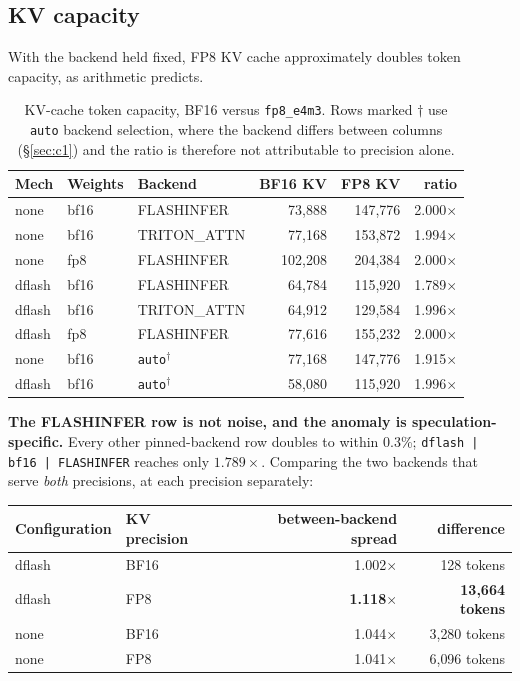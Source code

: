 \documentclass[11pt]{article}
\newcommand{\tw}[1]{\texttt{\small #1}}
\begin{document}
\subsection{KV capacity}

With the backend held fixed, FP8 KV cache approximately doubles token
capacity, as arithmetic predicts.

\begin{table}[h]\centering\small
\caption{KV-cache token capacity, BF16 versus \tw{fp8\_e4m3}. Rows marked
$\dagger$ use \tw{auto} backend selection, where the backend differs between
columns (\S\ref{sec:c1}) and the ratio is therefore not attributable to
precision alone.}
\begin{tabular}{lllrrr}
\toprule
Mech & Weights & Backend & BF16 KV & FP8 KV & ratio\\
\midrule
none & bf16 & FLASHINFER & 73{,}888 & 147{,}776 & 2.000$\times$\\
none & bf16 & TRITON\_ATTN & 77{,}168 & 153{,}872 & 1.994$\times$\\
none & fp8 & FLASHINFER & 102{,}208 & 204{,}384 & 2.000$\times$\\
dflash & bf16 & FLASHINFER & 64{,}784 & 115{,}920 & 1.789$\times$\\
dflash & bf16 & TRITON\_ATTN & 64{,}912 & 129{,}584 & 1.996$\times$\\
dflash & fp8 & FLASHINFER & 77{,}616 & 155{,}232 & 2.000$\times$\\
\midrule
none & bf16 & \tw{auto}$^\dagger$ & 77{,}168 & 147{,}776 & 1.915$\times$\\
dflash & bf16 & \tw{auto}$^\dagger$ & 58{,}080 & 115{,}920 & 1.996$\times$\\
\bottomrule
\end{tabular}
\end{table}

\noindent
\textbf{The FLASHINFER row is not noise, and the anomaly is
speculation-specific.} Every other pinned-backend row doubles to within
0.3\%; \tw{dflash\,|\,bf16\,|\,FLASHINFER} reaches only $1.789\times$.
Comparing the two backends that serve \emph{both} precisions, at each
precision separately:

\begin{table}[h]\centering\small
\begin{tabular}{llrr}
\toprule
Configuration & KV precision & between-backend spread & difference\\
\midrule
dflash & BF16 & 1.002$\times$ & 128 tokens\\
dflash & FP8 & \textbf{1.118$\times$} & \textbf{13{,}664 tokens}\\
none & BF16 & 1.044$\times$ & 3{,}280 tokens\\
none & FP8 & 1.041$\times$ & 6{,}096 tokens\\
\bottomrule
\end{tabular}
\end{table}
\end{document}
